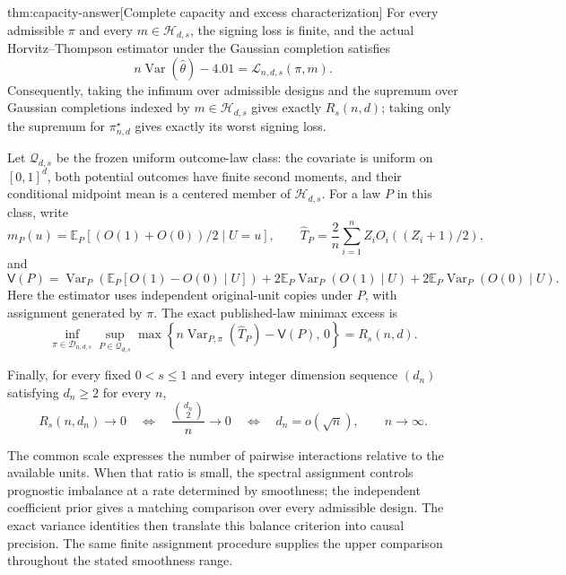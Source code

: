 \begin{theoremv}{thm:capacity-answer}[Complete capacity and excess characterization]
For every admissible \(\pi\) and every \(m\in\mathcal H_{d,s}\), the signing loss is finite, and the actual Horvitz--Thompson estimator under the Gaussian completion satisfies
\[
n\operatorname{Var}(\widehat\theta)-4.01
=
\mathcal L_{n,d,s}(\pi,m).
\]
Consequently, taking the infimum over admissible designs and the supremum over Gaussian completions indexed by \(m\in\mathcal H_{d,s}\) gives exactly \(R_s(n,d)\); taking only the supremum for \(\pi^\star_{n,d}\) gives exactly its worst signing loss.

Let \(\mathcal Q_{d,s}\) be the frozen uniform outcome-law class: the covariate is uniform on \([0,1]^d\), both potential outcomes have finite second moments, and their conditional midpoint mean is a centered member of \(\mathcal H_{d,s}\). For a law \(P\) in this class, write
\[
m_P(u)=\mathbb E_P[(O(1)+O(0))/2\mid U=u],
\qquad
\widehat T_P=\frac2n\sum_{i=1}^n Z_iO_i((Z_i+1)/2),
\]
and
\[
\mathsf V(P)
=
\operatorname{Var}_P\!\left(
\mathbb E_P[O(1)-O(0)\mid U]\right)
+
2\mathbb E_P\operatorname{Var}_P(O(1)\mid U)
+
2\mathbb E_P\operatorname{Var}_P(O(0)\mid U).
\]
Here the estimator uses independent original-unit copies under \(P\), with assignment generated by \(\pi\). The exact published-law minimax excess is
\[
\inf_{\pi\in\mathcal D_{n,d,s}}
\sup_{P\in\mathcal Q_{d,s}}
\max\!\left\{
n\operatorname{Var}_{P,\pi}(\widehat T_P)-\mathsf V(P),\,0
\right\}
=
R_s(n,d).
\]

Finally, for every fixed \(0<s\leq1\) and every integer dimension sequence \((d_n)\) satisfying \(d_n\geq2\) for every \(n\),
\[
R_s(n,d_n)\longrightarrow0
\quad\Longleftrightarrow\quad
\frac{\binom{d_n}{2}}{n}\longrightarrow0
\quad\Longleftrightarrow\quad
d_n=o(\sqrt n),
\qquad n\longrightarrow\infty.
\]
\end{theoremv}

The common scale expresses the number of pairwise interactions relative to the available units. When that ratio is small, the spectral assignment controls prognostic imbalance at a rate determined by smoothness; the independent coefficient prior gives a matching comparison over every admissible design. The exact variance identities then translate this balance criterion into causal precision. The same finite assignment procedure supplies the upper comparison throughout the stated smoothness range.

